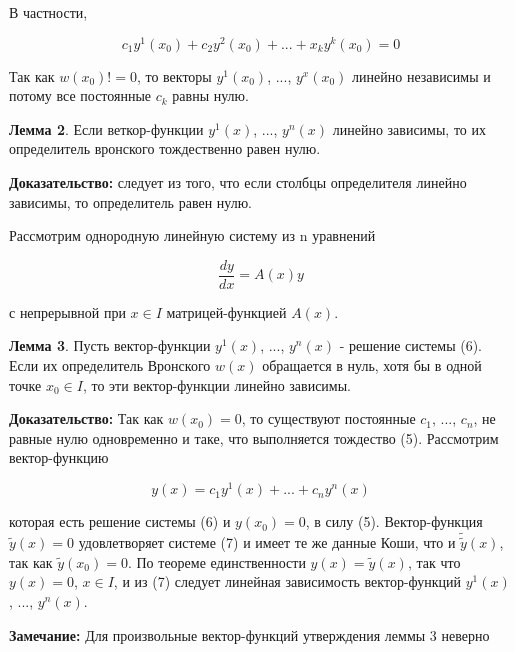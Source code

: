 \documentclass{article}
\begin{document}
    В частности,
    
    \begin{equation}
        c_1y^1(x_0) + c_2y^2(x_0) + ... + x_ky^k(x_0) = 0
    \end{equation}
    
    Так как $w(x_0)!=0$, то векторы $y^1(x_0)$, ..., $y^x(x_0)$ линейно независимы и потому все постоянные $c_k$ равны нулю.
    
    \textbf{Лемма 2}.
    Если веткор-функции $y^1(x)$, ..., $y^n(x)$ линейно зависимы, то их определитель вронского тождественно равен нулю.
    
    \textbf{Доказательство:}
    следует из того, что если столбцы определителя линейно зависимы, то определитель равен нулю. 
    
    Рассмотрим однородную линейную систему из n уравнений 
    
    \begin{equation}
        \frac{dy}{dx} = A(x)y
    \end{equation}
    
    с непрерывной при $x\in I$ матрицей-функцией $A(x)$.
    
    \textbf{Лемма 3}.
    Пусть вектор-функции $y^1(x)$, ..., $y^n(x)$ - решение системы (6). Если их определитель Вронского $w(x)$ обращается в нуль, хотя бы в одной точке $x_0\in I$, то эти вектор-функции линейно зависимы.
    
    \textbf{Доказательство:}
    Так как $w(x_0)=0$, то существуют постоянные $c_1$, ..., $c_n$, не равные нулю одновременно и таке, что выполняется тождество (5). Рассмотрим вектор-функцию
    
    \begin{equation}
        y(x) = c_1y^1(x) + ... + c_ny^n(x)
    \end{equation}
    
    которая есть решение системы (6) и $y(x_0) = 0$, в силу (5). Вектор-функция $\tilde y(x) = 0$ удовлетворяет системе (7) и имеет те же данные Коши, что и $\tilde \tilde y(x)$, так как $\tilde y(x_0) = 0$. По теореме единственности $y(x)=\tilde y(x)$, так что $y(x) = 0$, $x \in I$, и из (7) следует линейная зависимость вектор-функций $y^1(x)$, ..., $y^n(x)$.
    
    \textbf{Замечание:}
    Для произвольные вектор-функций утверждения леммы 3 неверно
    
\end{document}
